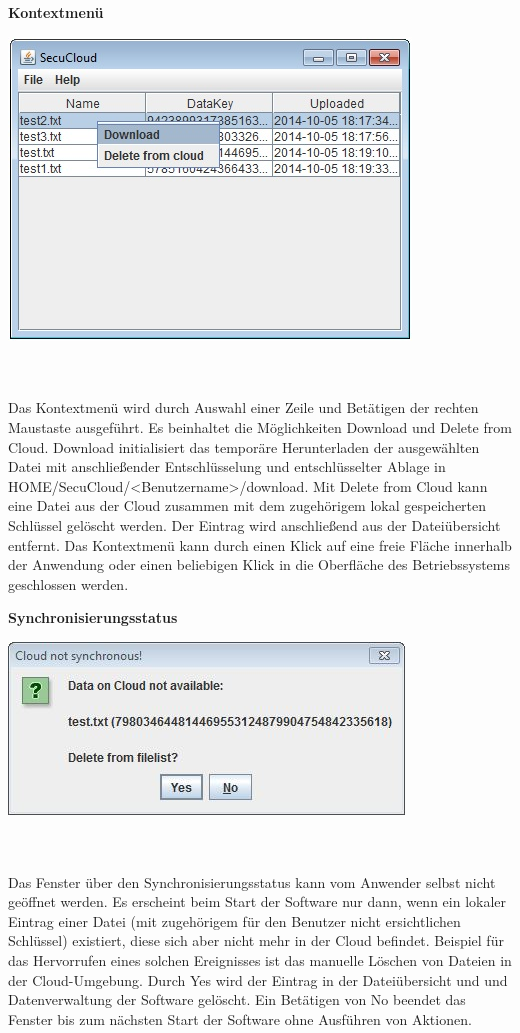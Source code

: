 \documentclass[12pt,a4paper,bibliography=totocnumbered,listof=totocnumbered]{scrartcl}
\begin{document}
\textbf{Kontextmenü}
\vspace{1em}
$\;$\\
\begin{minipage}{\linewidth}
	\centering
	\includegraphics[width=0.4\linewidth]{Kontext.jpg}
	\label{Kontext}
\end{minipage}
\\\\Das Kontextmenü wird durch Auswahl einer Zeile und Betätigen der rechten Maustaste ausgeführt. Es beinhaltet die Möglichkeiten Download und Delete from Cloud. Download initialisiert das temporäre Herunterladen der ausgewählten Datei mit anschließender Entschlüsselung und entschlüsselter Ablage in HOME/SecuCloud/\textless Benutzername\textgreater/download. Mit Delete from Cloud kann eine Datei aus der Cloud zusammen mit dem zugehörigem lokal gespeicherten Schlüssel gelöscht werden. Der Eintrag wird anschließend aus der Dateiübersicht entfernt. Das Kontextmenü kann durch einen Klick auf eine freie Fläche innerhalb der Anwendung oder einen beliebigen Klick in die Oberfläche des Betriebssystems geschlossen werden.

\textbf{Synchronisierungsstatus}
\vspace{1em}
$\;$\\
\begin{minipage}{\linewidth}
	\centering
	\includegraphics[width=0.4\linewidth]{Synchron.jpg}
	\label{Synchron}
\end{minipage}
\\\\Das Fenster über den Synchronisierungsstatus kann vom Anwender selbst nicht geöffnet werden. Es erscheint beim Start der Software nur dann, wenn ein lokaler Eintrag einer Datei (mit zugehörigem für den Benutzer nicht ersichtlichen Schlüssel) existiert, diese sich aber nicht mehr in der Cloud befindet. Beispiel für das Hervorrufen eines solchen Ereignisses ist das manuelle Löschen von Dateien in der Cloud-Umgebung. Durch Yes wird der Eintrag in der Dateiübersicht und und Datenverwaltung der Software gelöscht. Ein Betätigen von No beendet das Fenster bis zum nächsten Start der Software ohne Ausführen von Aktionen.
\pagebreak
\end{document}
